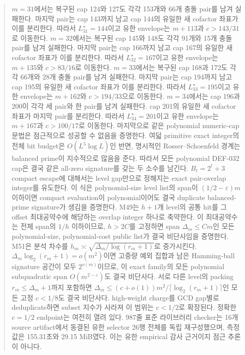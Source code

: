 \documentclass[11pt]{article}
\begin{document}
\begin{abstract}
\(m=31\)에서는 복구된 cap 124와 127도 각각 153개와 66개 충돌
pair를 남겨 실패한다. 마지막 pair는 cap 143까지 남고 cap 144의
유일한 새 cofactor 좌표가 이를 분리한다. 따라서
\(L_{31}^{\star}=144\)이고 유한 envelope는 \(m+113\)과
\(c>143/31\)로 이동한다.
\(m=32\)에서는 복구된 cap 145와 148도 각각 91개와 15개 충돌
pair를 남겨 실패한다. 마지막 pair는 cap 166까지 남고 cap 167의
유일한 새 cofactor 좌표가 이를 분리한다. 따라서
\(L_{32}^{\star}=167\)이고 유한 envelope는 \(m+135\)와
\(c>83/16\)로 이동한다.
\(m=33\)에서는 복구된 cap 168과 172도 각각 66개와 28개 충돌
pair를 남겨 실패한다. 마지막 pair는 cap 194까지 남고 cap 195의
유일한 새 cofactor 좌표가 이를 분리한다. 따라서
\(L_{33}^{\star}=195\)이고 유한 envelope는 \(m+162\)와
\(c>194/33\)으로 이동한다.
\(m=34\)에서는 cap 196과 200이 각각 세 pair와 한 pair를 남겨
실패한다. cap 201의 유일한 새 cofactor 좌표가 마지막 pair를
분리한다. 따라서 \(L_{34}^{\star}=201\)이고 유한 envelope는
\(m+167\)과 \(c>100/17\)로 이동한다.
마지막으로 같은 polynomial numeric-cap 문법은 점근적으로 성공할 수
없음을 증명한다. 여덟 primitive exact integer의 전체 bit budget은
\(O(L^5\log L)\)인 반면, 명시적인 Rosser--Schoenfeld 경계는 balanced
prime이 지수적으로 많음을 준다. 따라서 모든 polynomial DEF-032 cap은
결국 같은 all-zero signature를 갖는 두 소수를 남긴다.
\(B_t=2^t+3\) compact escape에 대해서는 level gap만으로 정해지는 exact
pair-overlap integer를 유도한다. 이 식은 polynomial-size level list의
span이 \((1/2-\varepsilon)m\) 이하이면 compact evaluation이
polynomial이어도 결국 duplicate balanced-prime signature가 생김을
증명한다.
M49는 \(h+1\)개 level의 공통 hit를 그 offset 최대공약수에 해당하는
overlap integer 하나로 축약한다. 이 최대공약수는 전체 span의
\(1/h\) 이하이므로, \(h>2C\)를 고정하면 span \(\Delta_m\le Cm\)인
모든 polynomial-size, polynomial-cost public list가 결국
비단사임을 증명한다.
M51은 분석 차수를
\(h_m\asymp\sqrt{\Delta_m/\log(r_m+1)}\)로 증가시킨다.
\(\Delta_m\log_2(r_m+1)=o(m^2)\)이면 고중량 예외 집합과 남은
Hamming-ball signature 공간이 모두 \(2^{o(m)}\)이므로, 이 exact
family의 모든 polynomial subquadratic span
\(O(m^{2-\varepsilon})\)도 결국 비단사다.
서로 다른 level의 packing \(r_m\le\Delta_m+1\)까지 포함하면
\(\Delta_m\le(c+o(1))m^2/\lceil\log_2(r_m+1)\rceil\)인 모든
고정 \(c<1/8\)도 결국 비단사다. high-weight charge를 GCD gap별로
deduplicate하면 subset 지수가 사라져 이 범위는 \(c<1/2\)로
확장된다. 정확한 \(c=1/2\) endpoint는
여전히 열려 있다.
987줄 표준 라이브러리 checker는 16개 source artifact에서 동결된 유한
selector 26행 전체를 독립 재구성했으며, 측정값은 155.31초와
29.15 MiB였다. 이는 유한 empirical 감사 근거이지 점근 추론이 아니다.

\end{abstract}
\end{document}
